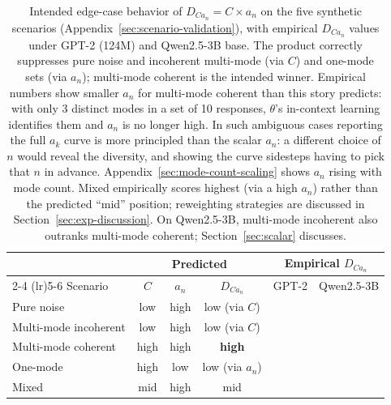 \begin{table}[t]
\centering
\small
\caption{Intended edge-case behavior of $D_{Ca_n} = C \times a_n$ on the five synthetic scenarios (Appendix~\ref{sec:scenario-validation}), with empirical $D_{Ca_n}$ values under GPT-2 (124M) and Qwen2.5-3B base.
The product correctly suppresses pure noise and incoherent multi-mode (via $C$) and one-mode sets (via $a_n$); multi-mode coherent is the intended winner.
Empirical numbers show smaller $a_n$ for multi-mode coherent than this story predicts: with only 3 distinct modes in a set of 10 responses, $\theta$'s in-context learning identifies them and $a_n$ is no longer high. In such ambiguous cases reporting the full $a_k$ curve is more principled than the scalar $a_n$: a different choice of $n$ would reveal the diversity, and showing the curve sidesteps having to pick that $n$ in advance. Appendix~\ref{sec:mode-count-scaling} shows $a_n$ rising with mode count.
Mixed empirically scores highest (via a high $a_n$) rather than the predicted ``mid'' position; reweighting strategies are discussed in Section~\ref{sec:exp-discussion}. On Qwen2.5-3B, multi-mode incoherent also outranks multi-mode coherent; Section~\ref{sec:scalar} discusses.}
\label{tab:edge-cases}
\begin{tabular}{@{}lccccc@{}}
\toprule
                      & \multicolumn{3}{c}{Predicted}            & \multicolumn{2}{c}{Empirical $D_{Ca_n}$} \\
\cmidrule(lr){2-4} \cmidrule(lr){5-6}
Scenario              & $C$  & $a_n$ & $D_{Ca_n}$              & GPT-2  & Qwen2.5-3B \\
\midrule
Pure noise            & low  & high  & low (via $C$)           & \scenarioPureNoiseGptDCan{}        & \scenarioPureNoiseQwenDCan{}        \\
Multi-mode incoherent & low  & high  & low (via $C$)           & \scenarioMultiIncoherentGptDCan{}  & \scenarioMultiIncoherentQwenDCan{}  \\
Multi-mode coherent   & high & high  & \textbf{high}           & \scenarioMultiModeGptDCan{}        & \scenarioMultiModeQwenDCan{}        \\
One-mode              & high & low   & low (via $a_n$)         & \scenarioOneModeGptDCan{}          & \scenarioOneModeQwenDCan{}          \\
Mixed                 & mid  & high  & mid                     & \scenarioMixedGptDCan{}            & \scenarioMixedQwenDCan{}            \\
\bottomrule
\end{tabular}
\end{table}

